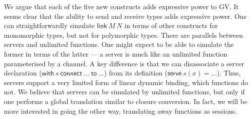 \documentclass{easychair}
\newcommand{\key}{\mathsf}
\newcommand{\gvLink}[2]{\key{link}~{#1}~{#2}}
\newcommand{\gvWith}[3]{\key{with}~{#1}~\key{connect}~{#2}~\key{to}~{#3}}
\newcommand{\gvServe}[3]{\key{serve}~{#1}({#2})={#3}}
\begin{document}
We argue that each of the five new constructs adds expressive power to
GV.
%
It seems clear that the ability to send and receive types adds
expressive power.
%
One can straightforwardly simulate $\gvLink{M}{N}$ in terms of other
constructs for monomorphic types, but not for polymorphic types.
%
There are parallels between servers and unlimited functions. One might
expect to be able to simulate the former in terms of the latter --- a
server is much like an unlimited function parameterised by a
channel. A key difference is that we can disassociate a server
declaration ($\gvWith{s}{\dots}{\dots}$) from its definition
($\gvServe{s}{x}{\dots}$). Thus, servers support a very limited form
of linear dynamic binding, which functions do not. We believe that
servers can be simulated by unlimited functions, but only if one
performs a global translation similar to closure conversion.
%
In fact, we will be more interested in going the other way,
translating away functions as sessions.
\end{document}
